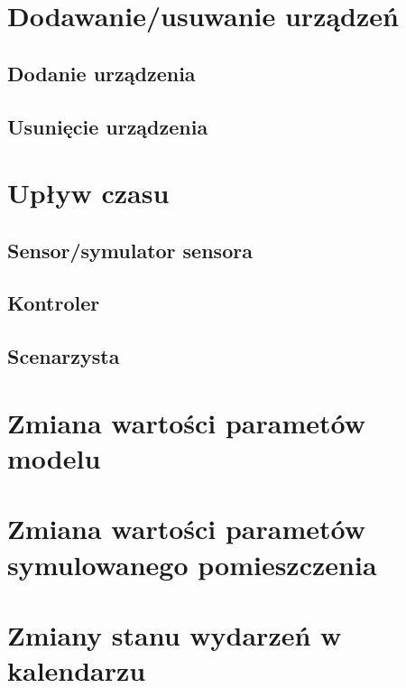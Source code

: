 \section{Dodawanie/usuwanie urządzeń}
\subsection*{Dodanie urządzenia}

\subsection*{Usunięcie urządzenia}


\section{Upływ czasu}
\subsection{Sensor/symulator sensora}

\subsection{Kontroler}

\subsection{Scenarzysta}


\section{Zmiana wartości parametów modelu}

\section{Zmiana wartości parametów symulowanego pomieszczenia}

\section{Zmiany stanu wydarzeń w kalendarzu}

